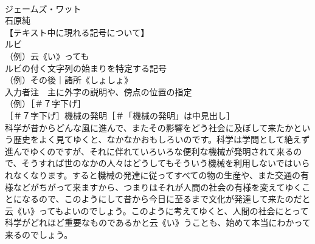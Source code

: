 \documentclass[8pt]{extreport}
\begin{document}
\begin{CJK}{UTF8}{min}
\\	ジェームズ・ワット
\\	石原純
\\	【テキスト中に現れる記号について】
\\	ルビ
\\	（例）云《い》っても
\\	ルビの付く文字列の始まりを特定する記号
\\	（例）その後｜諸所《しょしょ》
\\	入力者注　主に外字の説明や、傍点の位置の指定
\\	（例）［＃７字下げ］
\\	［＃７字下げ］機械の発明［＃「機械の発明」は中見出し］
\\	科学が昔からどんな風に進んで、またその影響をどう社会に及ぼして来たかという歴史をよく見てゆくと、なかなかおもしろいのです。科学は学問として絶えず進んでゆくのですが、それに伴れていろいろな便利な機械が発明されて来るので、そうすれば世のなかの人々はどうしてもそういう機械を利用しないではいられなくなります。すると機械の発達に従ってすべての物の生産や、また交通の有様などがちがって来ますから、つまりはそれが人間の社会の有様を変えてゆくことになるので、このようにして昔から今日に至るまで文化が発達して来たのだと云《い》ってもよいのでしょう。このように考えてゆくと、人間の社会にとって科学がどれほど重要なものであるかと云《い》うことも、始めて本当にわかって来るのでしょう。

\end{CJK}
\end{document}
